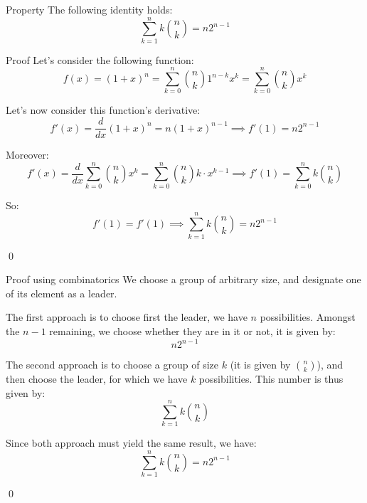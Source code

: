 \documentclass[a4paper]{article}
\begin{document}
\begin{parag}{Property}
    The following identity holds: 
    \[\sum_{k=1}^{n} k \binom{n}{k} = n2^{n-1}\]
    
    \begin{subparag}{Proof}
        Let's consider the following function: 
        \[f\left(x\right) = \left(1 + x\right)^{n} = \sum_{k = 0}^{n} \binom{n}{k} 1^{n-k} x^{k} = \sum_{k=0}^{n} \binom{n}{k} x^k\]
        
        Let's now consider this function's derivative: 
        \[f'\left(x\right) = \frac{d}{dx} \left(1 + x\right)^{n} = n\left(1 + x\right)^{n-1} \implies f'\left(1\right) = n 2^{n-1}\]
        
        Moreover: 
        \[f'\left(x\right) = \frac{d}{dx} \sum_{k=0}^{n} \binom{n}{k} x^k = \sum_{k=0}^{n} \binom{n}{k} k \cdot x^{k-1} \implies f'\left(1\right) = \sum_{k=0}^{n} k\binom{n}{k}\]
        
        So: 
        \[f'\left(1\right) = f'\left(1\right) \implies \sum_{k=1}^{n} k \binom{n}{k} = n2^{n-1}\]

        \qed
    \end{subparag}

    \begin{subparag}{Proof using combinatorics}
        We choose a group of arbitrary size, and designate one of its element as a leader.

        The first approach is to choose first the leader, we have $n$ possibilities. Amongst the $n-1$ remaining, we choose whether they are in it or not, it is given by: 
        \[n 2^{n-1}\]
        
        The second approach is to choose a group of size $k$ (it is given by $\binom{n}{k}$), and then choose the leader, for which we have $k$ possibilities. This number is thus given by:
        \[\sum_{k=1}^{n} k \binom{n}{k}\]

        Since both approach must yield the same result, we have:
        \[\sum_{k=1}^{n} k \binom{n}{k} = n2^{n-1}\]

        \qed
    \end{subparag}
    
\end{parag}
\end{document}

